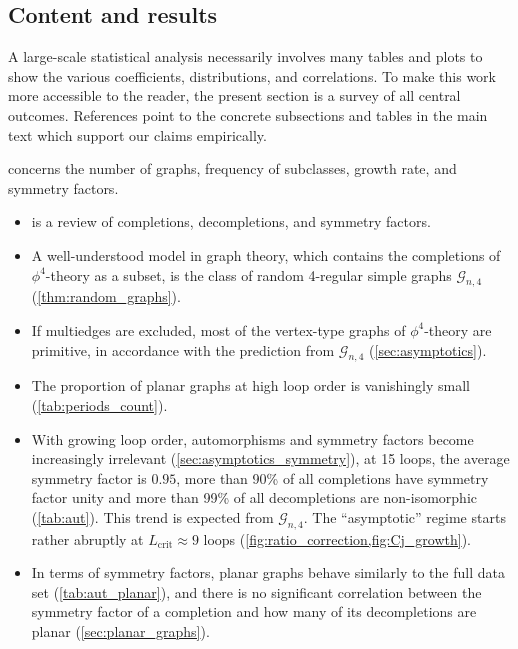 \documentclass[12pt,a4paper]{article}
\renewcommand{\|}{\rule[-0.4ex]{0.2ex}{1.2em}}
\begin{document}
\FloatBarrier
	
\subsection{Content and results}\label{sec:results}

A large-scale statistical analysis necessarily involves many tables and plots to show the various coefficients, distributions, and correlations. To make this work more accessible to the reader, the present section is a survey of all central outcomes. References point to the concrete subsections and tables in the main text which support our claims empirically. 
\bigskip


\noindent
{} concerns the number of graphs, frequency of subclasses, growth rate, and symmetry factors.
\begin{itemize}
	\item {} is a review of  completions, decompletions, and symmetry factors. 
	\item A well-understood model in graph theory, which contains the completions of $\phi^4$-theory as a subset, is the class of random 4-regular simple graphs $\mathcal{G}_{n,4}$  (\cref{thm:random_graphs}).
	\item If multiedges are excluded, most of the vertex-type graphs of $\phi^4$-theory are primitive, in accordance with the prediction from $\mathcal{G}_{n,4}$ (\cref{sec:asymptotics}).
	\item The proportion of planar graphs at high loop order is vanishingly small (\cref{tab:periods_count}).
	\item With growing loop order, automorphisms and symmetry factors become increasingly irrelevant (\cref{sec:asymptotics_symmetry}), at 15 loops, the average symmetry factor is $0.95$, more than 90\% of all completions have symmetry factor unity and more than 99\% of all decompletions are non-isomorphic (\cref{tab:aut}). This trend is expected from   $\mathcal{G}_{n,4}$. The \enquote{asymptotic} regime starts rather abruptly at $L_\text{crit}\approx 9$ loops (\cref{fig:ratio_correction,fig:Cj_growth}).
	\item In terms of symmetry factors, planar graphs behave similarly to the full data set (\cref{tab:aut_planar}), and there is no significant correlation between the symmetry factor of a completion and how many of its decompletions are planar (\cref{sec:planar_graphs}). 
\end{itemize}
	
\end{document}
